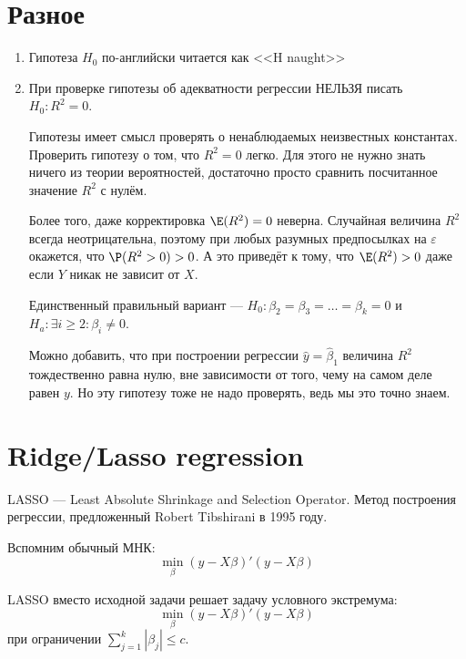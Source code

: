 \documentclass[pdftex,12pt,a4paper]{article}
\def \hb{\hat{\beta}}
\def \hy{\hat{y}}
\begin{document}
\section{Разное}
\begin{enumerate}

\item Гипотеза $H_0$ по-английски читается как <<H naught>>
\item При проверке гипотезы об адекватности регрессии НЕЛЬЗЯ писать $H_0: R^2=0$. 


Гипотезы имеет смысл проверять о ненаблюдаемых неизвестных константах. 
Проверить гипотезу о том, что $R^2=0$ легко. 
Для этого не нужно знать ничего из теории вероятностей, достаточно просто сравнить посчитанное значение $R^2$ с нулём. 

Более того, даже корректировка $\E(R^2)=0$ неверна. 
Случайная величина $R^2$ всегда неотрицательна, поэтому при любых разумных предпосылках на $\varepsilon$ окажется, что $\P(R^2>0)>0$. 
А это приведёт к тому, что $\E(R^2)>0$ даже если $Y$ никак не зависит от $X$.


Единственный правильный вариант --- $H_0: \beta_2=\beta_3=\ldots=\beta_k=0$ и $H_a: \exists i\geq 2 : \beta_i\neq 0$.

Можно добавить, что при построении регрессии $\hy=\hb_1$ величина $R^2$ тождественно равна нулю, вне зависимости от того, чему на самом деле равен $y$. Но эту гипотезу тоже не надо проверять, ведь мы это точно знаем.
\end{enumerate}



\section{Ridge/Lasso regression}

LASSO --- Least Absolute Shrinkage and Selection Operator. Метод построения регрессии, предложенный Robert Tibshirani в 1995 году.

Вспомним обычный МНК:
\begin{equation}
\min_{\beta} (y-X\beta)'(y-X\beta)
\end{equation}


LASSO вместо исходной задачи решает задачу условного экстремума:
\begin{equation}
\min_{\beta} (y-X\beta)'(y-X\beta)
\end{equation}
при ограничении $\sum_{j=1}^{k}|\beta_j|\leq c$.

\end{document}
